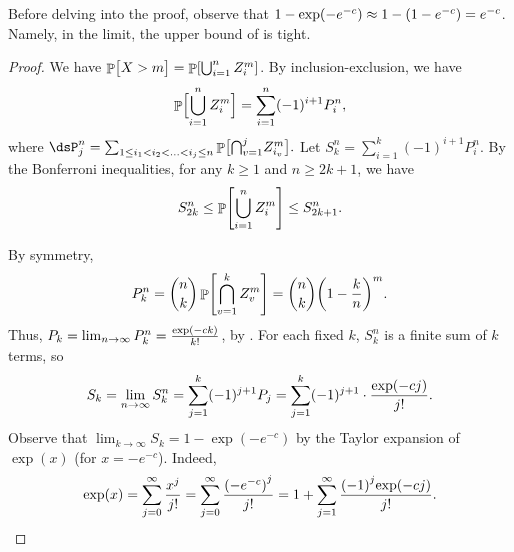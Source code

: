 Before delving into the proof, observe that $1 -\exp \pth{-e^{-c}}
\approx 1 - \pth{1 -e^{-c}} = e^{-c}$. Namely, in the limit, the upper
bound of  is tight.



\begin{proof}
    We have $\Prob{\bigl. X > m } = \Prob{ \bigcup_{i=1}^n Z_i^m}$. By
    inclusion-exclusion, we have
    \begin{equation*}        
        \Prob{ \smash{\bigcup_{i=1}^n Z_i^m}\Bigr. }%
        =%
        \sum_{i=1}^{n} (-1)^{i+1} P_i^n,
    \end{equation*}
    where
    \begin{math}
        \ds%
        P_j^n%
        =%
        \sum_{1 \leq i_1 < i_2 < \ldots < i_j \leq n} \Prob{
           \smash{\bigcap_{v=1}^{j}} Z_{i_v}^m}.
    \end{math}
    Let $S_k^n = \sum_{i=1}^{k} (-1)^{i+1} P_i^n$. By the Bonferroni inequalities,
    for any $k \geq 1$ and $n \geq 2k+1$, we have
    \begin{equation*}
        S_{2k}^{n} \leq \Prob{\bigcup_{i=1}^n Z_i^m } \leq S_{2k+1}^{n}.
    \end{equation*}
    
    By symmetry,
    \begin{equation*}
        P_k^n%
        =%
        \binom{n}{k} \Prob{ \bigcap_{v=1}^{k} Z_{v}^m}%
        =%
        \binom{n}{k} \pth[]{1-\frac{k}{n}}^m.
    \end{equation*}
    Thus, $P_k = \lim_{n\rightarrow \infty} P_k^n = \frac{\exp\pth{-ck}}{k!}$, by .
    For each fixed $k$, $S_k^n$ is a finite sum of $k$ terms, so
    \begin{equation*}
        S_k%
        =%
        \lim_{n \to \infty} S_k^n%
        =%
        \sum_{j=1}^{k} (-1)^{j+1} P_j%
        =%
        \sum_{j=1}^{k} (-1)^{j+1} \cdot \frac{\exp \pth{-c j}}{j!}.%
    \end{equation*}
    Observe that $\lim_{k \rightarrow \infty} S_k = 1 - \exp(
    -e^{-c})$ by the Taylor expansion of $\exp(x)$ (for $x =
    -e^{-c}$). Indeed,
    \begin{equation*}
        \exp\pth{ x}%
        =%
        \sum_{j=0}^{\infty} \frac{x^{j}}{j!}%
        =%
        \sum_{j=0}^{\infty} \frac{\pth{-e^{-c}}^{j}}{j!}%
        =%
        1 + \sum_{j=1}^{\infty} \frac{\pth{-1}^{j}{\exp \pth{-c
                 j}}}{j!}.        
    \end{equation*}
    

\end{proof}
